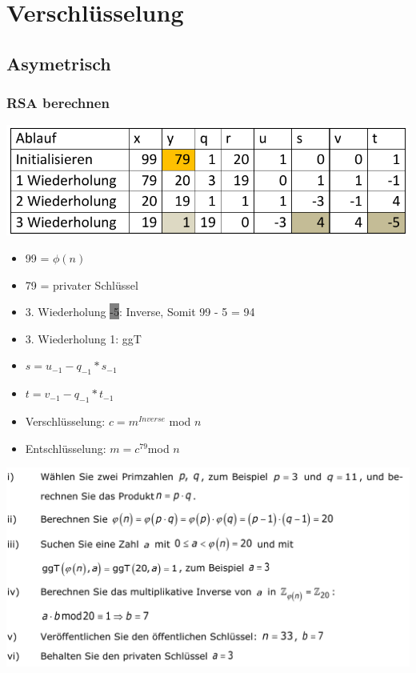 
\section{Verschlüsselung}

\subsection{Asymetrisch}

\subsubsection{RSA berechnen}
\includegraphics[width=\linewidth]{graphic/extern-reto/RSA.png}
\begin{itemize}
    \item 99 = $\phi(n)$
    \item 79 = privater Schlüssel
    \item 3. Wiederholung \colorbox{gray}{-5}: Inverse, Somit 99 - 5 = 94
    \item 3. Wiederholung \colorbox{lightlightgrey}{1}: ggT
    \item $s = u_{-1} - q_{-1} * s_{-1}$
    \item $t = v_{-1} - q_{-1} * t_{-1}$
    \item Verschlüsselung: $c = m^{Inverse} $ mod $ n$
    \item Entschlüsselung: $m = c^{79}$mod $n$
\end{itemize}
\includegraphics[width=\linewidth]{graphic/extern-reto/RSASchritte.png}

